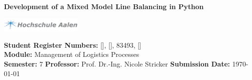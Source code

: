 \begin{center}
	
	\vspace{\baselineskip}
	
	
	\textbf{Development of a Mixed Model Line Balancing in Python}%
	
	\vspace{\baselineskip}
	
	
	\includegraphics[width=0.3\textwidth,  trim={0 0 162 0},clip]{HS_Logo.png}
	
	
\end{center}


\begin{flushleft}
	
	\vfill
	\textbf{Student Register Numbers: } [], [], 83493, []\\
	\textbf{Module: }Management of Logistics Processes\\
	\textbf{Semester: } 7 \linebreak
	\textbf{Professor:} Prof. Dr.-Ing. Nicole Stricker
	\linebreak \linebreak
	\textbf{Submission Date: }\today
	
\end{flushleft}

